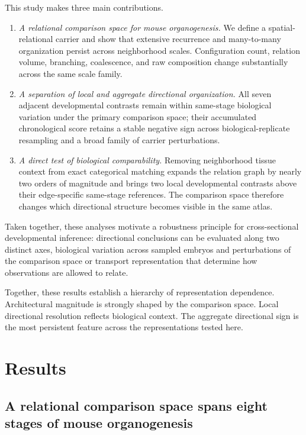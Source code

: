 \documentclass[11pt]{article}
\begin{document}
This study makes three main contributions.

\begin{enumerate}[leftmargin=1.8em]
\item \textit{A relational comparison space for mouse organogenesis.} We define a spatial-relational carrier and show that extensive recurrence and many-to-many organization persist across neighborhood scales. Configuration count, relation volume, branching, coalescence, and raw composition change substantially across the same scale family.

\item \textit{A separation of local and aggregate directional organization.} All seven adjacent developmental contrasts remain within same-stage biological variation under the primary comparison space; their accumulated chronological score retains a stable negative sign across biological-replicate resampling and a broad family of carrier perturbations.

\item \textit{A direct test of biological comparability.} Removing neighborhood tissue context from exact categorical matching expands the relation graph by nearly two orders of magnitude and brings two local developmental contrasts above their edge-specific same-stage references. The comparison space therefore changes which directional structure becomes visible in the same atlas.
\end{enumerate}

Taken together, these analyses motivate a robustness principle for cross-sectional developmental inference: directional conclusions can be evaluated along two distinct axes, biological variation across sampled embryos and perturbations of the comparison space or transport representation that determine how observations are allowed to relate.

Together, these results establish a hierarchy of representation dependence. Architectural magnitude is strongly shaped by the comparison space. Local directional resolution reflects biological context. The aggregate directional sign is the most persistent feature across the representations tested here.

\section{Results}

\subsection{A relational comparison space spans eight stages of mouse organogenesis}
\end{document}
